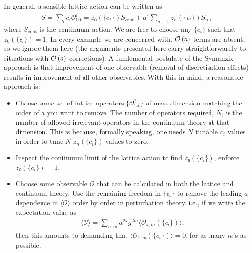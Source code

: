 In general, a sensible lattice action can be written as \cite{WEISZ19831}
\begin{align}
  S = \sum_{i} c_i \mathcal{O}^i_{\text{lat}} = z_0(\{c_i\}) S_{\text{cont}} + a^2 \sum_{n=1} z_n(\{c_i\}) S_n\,,
  \label{eq:continuum_limit_action}
\end{align}
where $S_{\text{cont}}$ is the continuum action. We are free to choose any $\{c_i\}$ such that $z_0(\{c_i\}) = 1$. In every example we are concerned with, $\mathcal{O}\left( a \right)$ terms are absent, so we ignore them here (the arguments presented here carry straightforwardly to situations with $\mathcal{O}\left( a \right)$ corrections). A fundemental postulate of the Symanzik approach is that improvement of one observable (removal of discretisation effects) results in improvement of all other observables. With this in mind, a reasonable approach is:
\begin{itemize}
\item
  Choose some set of lattice operators $\{\mathcal{O}^i_{\text{lat}}\}$ of mass dimension matching the order of $a$ you want to remove. The number of operators required, $N$, is the number of allowed irrelevant operators in the continuum theory at that dimension. This is because, formally speaking, one needs $N$ tunable $c_i$ values in order to tune $N$ $z_n(\{c_i\})$ values to zero.
\item
  Inspect the continuum limit of the lattice action to find $z_0(\{c_i\})$, enforce $z_0(\{c_i\})=1$.
\item
  Choose some observable $\mathcal{O}$ that can be calculated in both the lattice and continuum theory. Use the remaining freedom in $\{c_i\}$ to remove the leading $a$ dependence in $\langle \mathcal{O}\rangle$ order by order in perturbation theory. i.e., if we write the expectation value as
  \begin{align}
    \langle \mathcal{O} \rangle = \sum_{n,m} a^{2n} g^{2m}\langle \mathcal{O}_{n,m}(\{c_i\}) \rangle,
  \end{align}
  then this amounts to demanding that $\langle \mathcal{O}_{1,m}(\{c_i\})\rangle = 0$, for as many $m$'s as possible.
\end{itemize}

